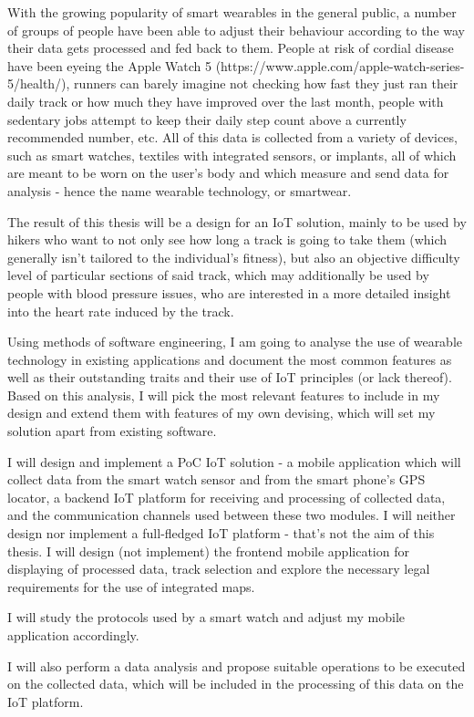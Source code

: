 \linebreak
With the growing popularity of smart wearables in the general public, a number of groups of people have been able to adjust their behaviour according to the way their data gets processed and fed back to them.
People at risk of cordial disease  have been eyeing the Apple Watch 5 (https://www.apple.com/apple-watch-series-5/health/), runners can barely imagine not checking how fast they just ran their daily track or how much they have improved over the last month, people with sedentary jobs attempt to keep their daily step count above a currently recommended number, etc.
All of this data is collected from a variety of devices, such as smart watches, textiles with integrated sensors, or implants, all of which are meant to be worn on the user's body and which measure and send data for analysis - hence the name wearable technology, or smartwear.

The result of this thesis will be a design for an IoT solution, mainly to be used by hikers  who want to not only see how long a track is going to take them (which generally isn't tailored to the individual's fitness),
but also an objective difficulty level of particular sections of said track, which may additionally be used by people with blood pressure issues, who are interested in a more detailed insight into the heart rate induced by the track.

Using methods of software engineering, I am going to analyse the use of wearable technology in existing applications and document the most common features as well as their outstanding traits and their use of IoT principles (or lack thereof).
Based on this analysis, I will pick the most relevant features to include in my design and extend them with features of my own devising, which will set my solution apart from existing software.

I will design and implement a PoC IoT solution - a mobile application which will collect data from the smart watch sensor and from the smart phone's GPS locator, a backend IoT platform for receiving and processing of collected data, and the communication channels used between these two modules.
I will neither design nor implement a full-fledged IoT platform - that's not the aim of this thesis.
I will design (not implement) the frontend mobile application for displaying of processed data, track selection and explore the necessary legal requirements for the use of integrated maps.

I will study the protocols used by a smart watch  and adjust my mobile application accordingly.

I will also perform a data analysis and propose suitable operations to be executed on the collected data, which will be included in the processing of this data on the IoT platform.

